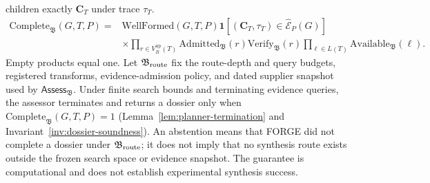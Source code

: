\documentclass{article}
\begin{document}
children exactly $\mathbf C_T$ under trace $\tau_T$.
\begin{equation}
\begin{aligned}
    \mathrm{Complete}_{\mathfrak B}(G,T,P)
    ={}&\mathrm{WellFormed}(G,T,P)
    \mathbf 1\!\left[(\mathbf C_T,\tau_T)\in\widehat{\mathcal E}_P(G)\right]\\
    &\times\prod_{r\in V_R^{\mathrm{up}}(T)}
    \mathrm{Admitted}_{\mathfrak B}(r)\mathrm{Verify}_{\mathfrak B}(r)
    \prod_{\ell\in L(T)}\mathrm{Available}_{\mathfrak B}(\ell).
\end{aligned}
\end{equation}
Empty products equal one. Let $\mathfrak B_{\rm route}$ fix the route-depth and query budgets,
registered transforms, evidence-admission policy, and dated supplier snapshot used by
$\mathsf{Assess}_{\mathfrak B}$.
Under finite search bounds and terminating evidence queries, the assessor terminates and returns a
dossier only when $\mathrm{Complete}_{\mathfrak B}(G,T,P)=1$
(Lemma~\ref{lem:planner-termination} and Invariant~\ref{inv:dossier-soundness}).
An abstention means that FORGE did not complete a dossier under $\mathfrak B_{\rm route}$; it does not imply that
no synthesis route exists outside the frozen search space or evidence snapshot.
The guarantee is computational and does not establish experimental synthesis success.
\end{document}
